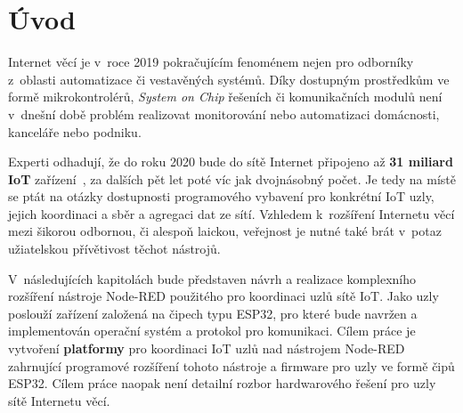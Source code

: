 \chapter{Úvod}
\label{ch:uvod}

Internet věcí je v~roce 2019 pokračujícím fenoménem nejen pro odborníky z~oblasti automatizace či vestavěných systémů.
Díky dostupným prostředkům ve formě mikrokontrolérů, \textit{System on Chip} řešeních či komunikačních modulů není
v~dnešní době problém realizovat monitorování nebo automatizaci domácnosti, kanceláře nebo podniku.

Experti odhadují, že do roku 2020 bude do sítě Internet připojeno až \textbf{31 miliard IoT}
zařízení~\cite{StatistaIoT, IoTTrends}, za dalších pět let poté víc jak dvojnásobný počet.
Je tedy na místě se ptát na otázky dostupnosti programového vybavení pro konkrétní IoT uzly, jejich koordinaci a sběr
a agregaci dat ze sítí.
Vzhledem k~rozšíření Internetu věcí mezi šikorou odbornou, či alespoň laickou, veřejnost je nutné také brát v~potaz
užiatelskou přívětivost těchot nástrojů.

V~následujících kapitolách bude představen návrh a realizace komplexního rozšíření nástroje Node-RED použitého pro
koordinaci uzlů sítě IoT. Jako uzly poslouží zařízení založená na čipech typu ESP32, pro které bude navržen a
implementován operační systém a protokol pro komunikaci.
Cílem práce je vytvoření \textbf{platformy} pro koordinaci IoT uzlů nad nástrojem Node-RED zahrnující
programové rozšíření tohoto nástroje a firmware pro uzly ve formě čipů ESP32.
Cílem práce naopak není detailní rozbor hardwarového řešení pro uzly sítě Internetu věcí.

